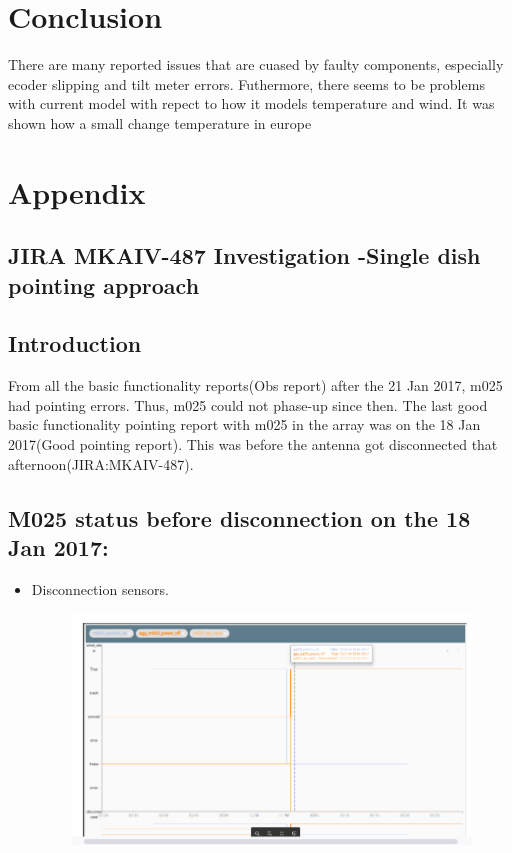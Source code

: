 \documentclass{article}
\begin{document}
{      
\section{Conclusion}
There are many reported issues that are cuased by faulty components, especially ecoder slipping and tilt meter errors. Futhermore, there seems to be problems with current model with repect to how it models temperature and wind.  It was shown how a small change temperature in europe

\clearpage



\clearpage
\section{Appendix}
\appendix
\begin{appendices}
	\section{JIRA MKAIV-487 Investigation -Single dish pointing approach  }\label{sec.py1}
	\subsection{Introduction}
	  From all the basic functionality reports(Obs report) after the 21 Jan 2017, m025 had pointing errors.  Thus, m025 could not phase-up since then.  The last good basic functionality pointing report with m025 in the array was on the 18 Jan 2017(Good pointing report).  This was before the antenna got disconnected that afternoon(JIRA:MKAIV-487).   
	  
	  \subsection{M025 status before disconnection on the 18 Jan 2017:}
	  \begin{itemize}
	 \item Disconnection sensors.  
	  \begin{figure}[H]
	  	\centering
	  	\includegraphics[scale=0.33]{m025_investigate.png}
	  	

\end{figure}
\end{itemize}
\end{appendices}}
\end{document}
